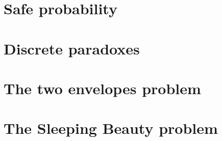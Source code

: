 \documentclass[twoside,a4paper]{report}
\theoremstyle{plain}
\theoremstyle{definition}
\theoremstyle{remark}
\numberwithin{equation}{chapter}
\DeclareMathOperator{\1}{\mathbbm{1}}
\begin{document}
\chapter{Safe probability}\label{chap:SafeProp}

\chapter{Discrete paradoxes}\label{chap:DiscPara}

\chapter{The two envelopes problem}\label{chap:TwoEnvelope}

\chapter{The Sleeping Beauty problem}\label{chap:SleepingBeauty}




\appendix

\newpage

\printindex
\end{document}
